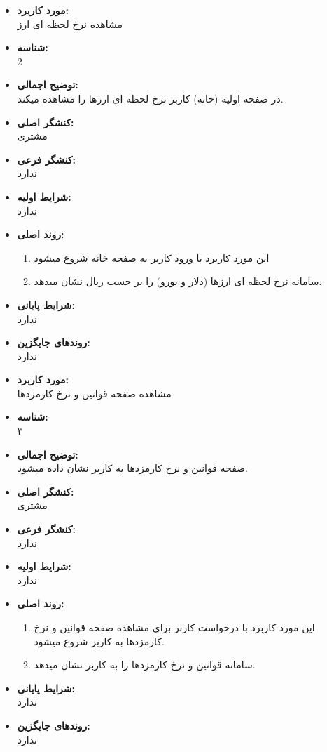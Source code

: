 \documentclass{article}
\begin{document}
\begin{itemize}
\item \textbf{مورد کاربرد:}\\
مشاهده نرخ لحظه ای ارز 
\item \textbf{شناسه:}\\
2
\item \textbf{توضیح اجمالی:}\\

در صفحه اولیه (خانه) کاربر نرخ لحظه ای ارزها را مشاهده میکند. 
\item \textbf{کنشگر اصلی:}\\
مشتری
\item \textbf{کنشگر فرعی:}\\
ندارد
\item \textbf{شرایط اولیه:}\\
ندارد
\item \textbf{روند اصلی:}\\
\begin{enumerate}
\item این مورد کاربرد با ورود کاربر به صفحه خانه شروع میشود
\item سامانه نرخ لحظه ای ارزها (دلار و یورو) را بر حسب ریال نشان میدهد. 
\end{enumerate}
\item \textbf{شرایط پایانی:}\\ 
ندارد
\item \textbf{روندهای جایگزین:}\\
ندارد
\end{itemize}
\noindent\makebox[\linewidth]{\rule{\paperwidth}{0.4pt}}
\begin{itemize}
\item \textbf{مورد کاربرد:}\\
مشاهده صفحه قوانین و نرخ کارمزدها 
\item \textbf{شناسه:}\\
۳
\item \textbf{توضیح اجمالی:}\\
صفحه قوانین و نرخ کارمزدها به کاربر نشان داده میشود. 
\item \textbf{کنشگر اصلی:}\\
مشتری
\item \textbf{کنشگر فرعی:}\\
ندارد
\item \textbf{شرایط اولیه:}\\
ندارد
\item \textbf{روند اصلی:}\\
\begin{enumerate}
\item  این مورد کاربرد با درخواست کاربر برای مشاهده صفحه قوانین و نرخ کارمزدها به کاربر شروع میشود.
\item سامانه قوانین و نرخ کارمزدها را به کاربر نشان میدهد.
\end{enumerate}
\item \textbf{شرایط پایانی:}\\ 
ندارد
\item \textbf{روندهای جایگزین:}\\
ندارد
\end{itemize}
\end{document}

